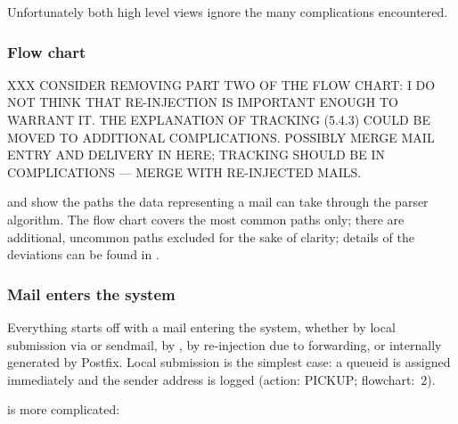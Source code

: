 Unfortunately both high level views ignore the many complications
encountered.


\subsubsection{Flow chart}

\label{flow-chart}

XXX CONSIDER REMOVING PART TWO OF THE FLOW CHART\@: I DO NOT THINK THAT
RE-INJECTION IS IMPORTANT ENOUGH TO WARRANT IT\@.  THE EXPLANATION OF
TRACKING (\textsection{}5.4.3) COULD BE MOVED TO ADDITIONAL
COMPLICATIONS\@.  POSSIBLY MERGE MAIL ENTRY AND DELIVERY IN HERE\@;
TRACKING SHOULD BE IN COMPLICATIONS --- MERGE WITH RE-INJECTED MAILS\@.

 and 
show the paths the data representing a mail can take through the parser
algorithm.  The flow chart covers the most common paths only; there are
additional, uncommon paths excluded for the sake of clarity; details of the
deviations can be found in .



\clearpage

\subsubsection{Mail enters the system}

\label{mail-enters-the-system}

Everything starts off with a mail entering the system, whether by local
submission via  or sendmail, by \SMTP{}, by re-injection
due to forwarding, or internally generated by Postfix.  Local submission is
the simplest case: a queueid is assigned immediately and the sender address
is logged (action: PICKUP\@; flowchart:~2).

\SMTP{} is more complicated:

